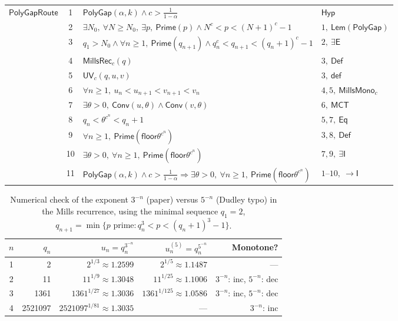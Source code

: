 \documentclass[11pt,reqno]{amsart}
\newcommand{\floor}{\mathsf{floor}}
\theoremstyle{blueplain}
\numberwithin{equation}{section}
\begin{document}
{\begin{longtable}{|p{3cm}|c|p{10cm}|p{4cm}|}
	\multirow{11}{*}{$\mathsf{PolyGapRoute}$} &
	1 & $\mathsf{PolyGap}(\alpha,k)\wedge c>\tfrac{1}{1-\alpha}$ & $\mathsf{Hyp}$\\
	\cline{2-4}
	& 2 & $\exists N_0,\ \forall N\ge N_0,\ \exists p,\ \mathsf{Prime}(p)\wedge N^c<p<(N+1)^c-1$ & $1,\ \mathsf{Lem}(\mathsf{PolyGap})$\\
	\cline{2-4}
	& 3 & $q_1>N_0\wedge\forall n\ge1,\ \mathsf{Prime}(q_{n+1})\wedge q_n^c<q_{n+1}<(q_n+1)^c-1$ & $2,\ \exists\mathsf{E}$\\
	\cline{2-4}
	& 4 & $\mathsf{MillsRec}_c(q)$ & $3,\ \mathsf{Def}$\\
	\cline{2-4}
	& 5 & $\mathsf{UV}_c(q,u,v)$ & $3,\ \mathsf{def}$\\
	\cline{2-4}
	& 6 & $\forall n\ge1,\ u_n<u_{n+1}<v_{n+1}<v_n$ & $4,5,\ \mathsf{MillsMono}_c$\\
	\cline{2-4}
	& 7 & $\exists\theta>0,\ \mathsf{Conv}(u,\theta)\wedge\mathsf{Conv}(v,\theta)$ & $6,\ \mathsf{MCT}$\\
	\cline{2-4}
	& 8 & $q_n<\theta^{c^n}<q_n+1$ & $5,7,\ \mathsf{Eq}$\\
	\cline{2-4}
	& 9 & $\forall n\ge1,\ \mathsf{Prime}(\floor{\theta^{c^n}})$ & $3,8,\ \mathsf{Def}$\\
	\cline{2-4}
	& 10 & $\exists\theta>0,\ \forall n\ge1,\ \mathsf{Prime}(\floor{\theta^{c^n}})$ & $7,9,\ \exists\mathsf{I}$\\
	\cline{2-4}
	& 11 & $\mathsf{PolyGap}(\alpha,k)\wedge c>\tfrac{1}{1-\alpha}\Rightarrow\exists\theta>0,\ \forall n\ge1,\ \mathsf{Prime}(\floor{\theta^{c^n}})$ & $1\text{--}10,\ \rightarrow\mathsf{I}$\\
	\hline
	
\end{longtable}
\label{sec:appendix-tables}

\begin{table}[H]
	\centering
	\caption{Numerical check of the exponent \(3^{-n}\) (paper) versus \(5^{-n}\)
		(Dudley typo) in the Mills recurrence, using the minimal sequence
		\(q_1=2\), \(q_{n+1}=\min\{p\text{ prime}: q_n^3<p<(q_n+1)^3-1\}\).}
	\label{tab:exponent-typo}
	{\small
		\begin{tabular}{|c|r|r|r|r|}
			\hline
			\(n\) & \(q_n\) & \(u_n=q_n^{3^{-n}}\) & \(u_n^{(5)}=q_n^{5^{-n}}\)
			& Monotone? \\
			\hline
			1 & 2 & \(2^{1/3}\approx 1.2599\) & \(2^{1/5}\approx 1.1487\) & --- \\
			2 & 11 & \(11^{1/9}\approx 1.3048\) & \(11^{1/25}\approx 1.1006\) &
			\(3^{-n}\): inc, \(5^{-n}\): dec \\
			3 & 1361 & \(1361^{1/27}\approx 1.3036\) & \(1361^{1/125}\approx 1.0586\) &
			\(3^{-n}\): inc, \(5^{-n}\): dec \\
			4 & 2521097 & \(2521097^{1/81}\approx 1.3035\) & --- &
			\(3^{-n}\): inc \\
			\hline
		\end{tabular}
	}
\end{table}

}
\end{document}
